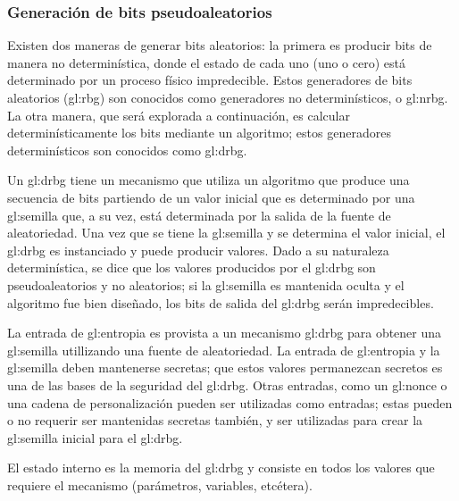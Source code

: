 %
%

\subsubsection{Generación de bits pseudoaleatorios}
\label{sec:generadores_pseudoaleatorios}

Existen dos maneras de generar bits aleatorios: la primera es producir bits
de manera no determinística, donde el estado de cada uno (uno o cero) está
determinado por un proceso físico impredecible. Estos generadores de bits
aleatorios (\gls{gl:rbg}) son conocidos como generadores no determinísticos, o
\gls{gl:nrbg}. La otra manera, que será explorada a continuación, es calcular
determinísticamente los bits mediante un algoritmo; estos generadores
determinísticos son conocidos como \gls{gl:drbg}.

Un \gls{gl:drbg} tiene un mecanismo que utiliza un algoritmo que produce una
secuencia de bits partiendo de un valor inicial que es determinado por una
\gls{gl:semilla} que, a su vez, está determinada por la salida de la fuente de
aleatoriedad. Una vez que se tiene la \gls{gl:semilla} y se determina el valor
inicial, el \gls{gl:drbg} es instanciado y puede producir valores. Dado a su
naturaleza determinística, se dice que los valores producidos por el
\gls{gl:drbg} son pseudoaleatorios y no aleatorios; si la \gls{gl:semilla} es
mantenida oculta y el algoritmo fue bien diseñado, los bits de salida del
\gls{gl:drbg} serán impredecibles.


La entrada de \gls{gl:entropia} es provista a un mecanismo \gls{gl:drbg} para
obtener una \gls{gl:semilla} utillizando una fuente de aleatoriedad. La entrada
de \gls{gl:entropia} y la \gls{gl:semilla} deben mantenerse secretas; que estos
valores permanezcan secretos es una de las bases de la seguridad del
\gls{gl:drbg}. Otras entradas, como un \gls{gl:nonce} o una cadena de
personalización pueden ser utilizadas como entradas; estas pueden o no requerir
ser mantenidas secretas también, y ser utilizadas para crear la \gls{gl:semilla}
inicial para el \gls{gl:drbg}.

El estado interno es la memoria del \gls{gl:drbg} y consiste en todos los
valores que requiere el mecanismo (parámetros, variables, etcétera).


